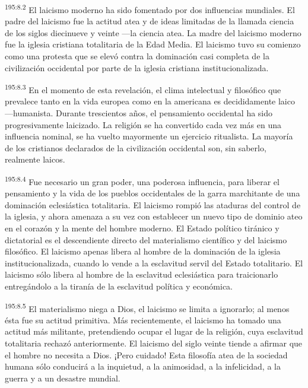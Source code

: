 \par 
\textsuperscript{195:8.2} El laicismo moderno ha sido fomentado por dos influencias mundiales. El padre del laicismo fue la actitud atea y de ideas limitadas de la llamada ciencia de los siglos diecinueve y veinte ---la ciencia atea. La madre del laicismo moderno fue la iglesia cristiana totalitaria de la Edad Media. El laicismo tuvo su comienzo como una protesta que se elevó contra la dominación casi completa de la civilización occidental por parte de la iglesia cristiana institucionalizada.

\par 
\textsuperscript{195:8.3} En el momento de esta revelación, el clima intelectual y filosófico que prevalece tanto en la vida europea como en la americana es decididamente laico ---humanista. Durante trescientos años, el pensamiento occidental ha sido progresivamente laicizado. La religión se ha convertido cada vez más en una influencia nominal, se ha vuelto mayormente un ejercicio ritualista. La mayoría de los cristianos declarados de la civilización occidental son, sin saberlo, realmente laicos.

\par 
\textsuperscript{195:8.4} Fue necesario un gran poder, una poderosa influencia, para liberar el pensamiento y la vida de los pueblos occidentales de la garra marchitante de una dominación eclesiástica totalitaria. El laicismo rompió las ataduras del control de la iglesia, y ahora amenaza a su vez con establecer un nuevo tipo de dominio ateo en el corazón y la mente del hombre moderno. El Estado político tiránico y dictatorial es el descendiente directo del materialismo científico y del laicismo filosófico. El laicismo apenas libera al hombre de la dominación de la iglesia institucionalizada, cuando lo vende a la esclavitud servil del Estado totalitario. El laicismo sólo libera al hombre de la esclavitud eclesiástica para traicionarlo entregándolo a la tiranía de la esclavitud política y económica.

\par 
\textsuperscript{195:8.5} El materialismo niega a Dios, el laicismo se limita a ignorarlo; al menos ésta fue su actitud primitiva. Más recientemente, el laicismo ha tomado una actitud más militante, pretendiendo ocupar el lugar de la religión, cuya esclavitud totalitaria rechazó anteriormente. El laicismo del siglo veinte tiende a afirmar que el hombre no necesita a Dios. ¡Pero cuidado! Esta filosofía atea de la sociedad humana sólo conducirá a la inquietud, a la animosidad, a la infelicidad, a la guerra y a un desastre mundial.

